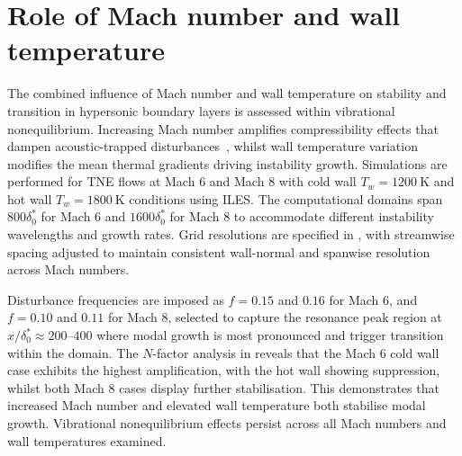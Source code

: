 
\section{Role of Mach number and wall temperature}

The combined influence of Mach number and wall temperature on stability and transition in hypersonic boundary layers is assessed within vibrational nonequilibrium. Increasing Mach number amplifies compressibility effects that dampen acoustic-trapped disturbances~\citep{BitterShepherd2015}, whilst wall temperature variation modifies the mean thermal gradients driving instability growth. Simulations are performed for \gls{TNE} flows at Mach 6 and Mach 8 with cold wall $T_w = 1200~\text{K}$ and hot wall $T_w = 1800~\text{K}$ conditions using \gls{ILES}. The computational domains span $800\delta^*_0$ for Mach 6 and $1600\delta^*_0$ for Mach 8 to accommodate different instability wavelengths and growth rates. Grid resolutions are specified in , with streamwise spacing adjusted to maintain consistent wall-normal and spanwise resolution across Mach numbers.

Disturbance frequencies are imposed as $f = 0.15$ and $0.16$ for Mach 6, and $f = 0.10$ and $0.11$ for Mach 8, selected to capture the resonance peak region at $x/\delta^*_0 \approx 200$--$400$ where modal growth is most pronounced and trigger transition within the domain. The $N$-factor analysis in  reveals that the Mach 6 cold wall case exhibits the highest amplification, with the hot wall showing suppression, whilst both Mach 8 cases display further stabilisation. This demonstrates that increased Mach number and elevated wall temperature both stabilise modal growth. Vibrational nonequilibrium effects persist across all Mach numbers and wall temperatures examined.

